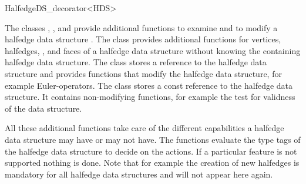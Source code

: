 
\ccRefPageBegin



\begin{ccRefClass}{HalfedgeDS_decorator<HDS>}

\ccDefinition
  
The classes ,
, and
 provide additional functions
to examine and to modify a halfedge data structure . The class
 provides additional functions
for vertices, halfedges, , and faces 
of a halfedge data structure without knowing the containing 
halfedge data structure. The class
 stores a reference to the halfedge
data structure and provides functions that modify the halfedge data
structure, for example Euler-operators. The class
 stores a const reference to
the halfedge data structure. It contains non-modifying functions, for
example the test for validness of the data structure.

All these additional functions take care of the different capabilities
a halfedge data structure may have or may not have.  The functions
evaluate the type tags of the halfedge data structure to decide on the
actions. If a particular feature is not supported nothing is done.
Note that for example the creation of new halfedges is mandatory for
all halfedge data structures and will not appear here again.


\ccInheritsFrom


\ccCreation
{}

\ccThreeToTwo


\end{ccRefClass}
